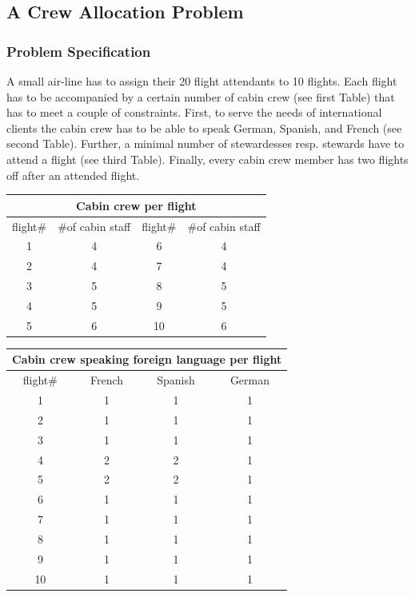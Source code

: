 \documentclass[a4paper,halfparskip]{scrartcl}
\begin{document}
\newpage
\subsection{A Crew Allocation Problem}

\subsubsection{Problem Specification}
A small air-line has to assign their 20 flight attendants 
to 10 flights. Each flight has to be accompanied by a certain 
number of cabin crew (see first Table) that has to meet a couple 
of constraints. First, to serve the needs of international 
clients the cabin crew has to be able to speak German, Spanish, 
and French (see second Table). Further, a minimal number of 
stewardesses resp. stewards have to attend a flight 
(see third Table). Finally, every cabin crew member has 
two flights off after an attended flight.

\begin{tabular}{||c|c||c|c||}
\hline
\multicolumn{4}{||c||}{Cabin crew per flight}\\
\hline
flight$\#$ & $\#$of cabin staff & flight$\#$ & $\#$of cabin staff\\
\hline 
1 & 4 & 6 & 4\\
\hline
2 & 4 & 7 & 4 \\
\hline
3 & 5 & 8 & 5 \\
\hline
4 & 5 & 9 & 5 \\
\hline
5 & 6 & 10 & 6\\
\hline   
\end{tabular}

\begin{tabular}{||c||c|c|c||}
\hline
\multicolumn{4}{||c||}{Cabin crew speaking foreign language per flight}\\
\hline
flight$\#$ & French  & Spanish & German \\
\hline 
1 & 1 & 1 & 1\\
\hline
2 & 1 & 1 & 1 \\
\hline
3 & 1 & 1 & 1 \\
\hline
4 & 2 & 2 & 1 \\
\hline
5 & 2 & 2 & 1\\
\hline   
6 & 1 & 1 & 1\\
\hline
7 & 1 & 1 & 1 \\
\hline
8 & 1 & 1 & 1 \\
\hline
9 & 1 & 1 & 1 \\
\hline
10 & 1 & 1 & 1\\
\hline   
\end{tabular}
\end{document}
